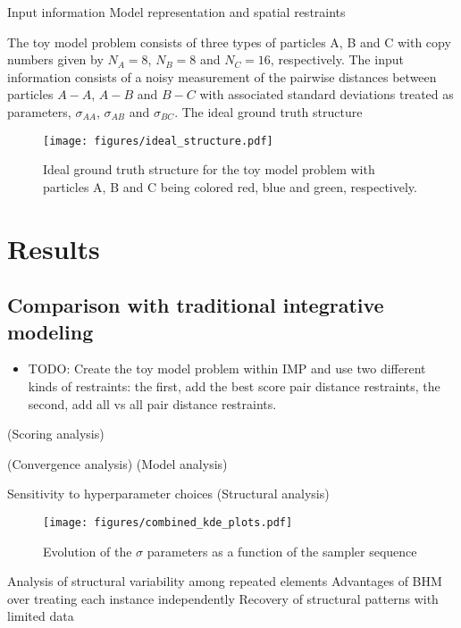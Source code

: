 \documentclass[pdflatex,sn-mathphys-num]{sn-jnl}%
\theoremstyle{thmstyleone}%
\theoremstyle{thmstyletwo}%
\theoremstyle{thmstylethree}%
\begin{document}
{Input information
Model representation and spatial restraints

The toy model problem consists of three types of particles 
A, B and C with copy numbers given by $N_A=8$, $N_B=8$ and $N_C=16$,
respectively. The input information consists of a noisy measurement 
of the pairwise distances between particles $A-A$, $A-B$ and $B-C$
with associated standard deviations treated as parameters, 
$\sigma_{AA}$, $\sigma_{AB}$ and $\sigma_{BC}$.
The ideal ground truth structure 
\begin{figure}
    \centering
    \texttt{[image: figures/ideal\_structure.pdf]}
    \caption{Ideal ground truth structure for the toy model problem with 
    particles A, B and C being colored red, blue and green, respectively.}
    \label{fig:enter-label}
\end{figure}
\section{Results}

\subsection{Comparison with traditional integrative modeling}
\begin{itemize}
\item TODO: Create the toy model problem within IMP and use two different kinds of restraints:
the first, add the best score pair distance restraints, the second, add all vs all pair distance 
restraints.
\end{itemize}
(Scoring analysis)

(Convergence analysis)
(Model analysis)

Sensitivity to hyperparameter choices
(Structural analysis)
\begin{figure}
    \centering
    \texttt{[image: figures/combined\_kde\_plots.pdf]}
    \caption{Evolution of the $\sigma$ parameters as a function of the sampler sequence}
    \label{fig:enter-label}
\end{figure}
Analysis of structural variability among repeated elements
Advantages of BHM over treating each instance independently
Recovery of structural patterns with limited data

}
\end{document}
